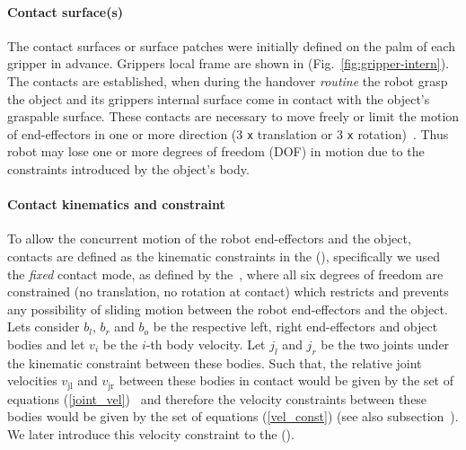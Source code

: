 \paragraph*{Contact surface(s)} 

The contact surfaces or surface patches were initially defined on the palm of each gripper in advance. Grippers local frame are shown in (Fig.~\ref{fig:gripper-intern}). The contacts are established, when during the handover \textit{routine} the robot grasp the object and its grippers internal surface come in contact with the object's graspable surface. These contacts are necessary to move freely or limit the motion of end-effectors in one or more direction (3 \texttt{x} translation or 3 \texttt{x} rotation)~\cite{bouyarmane2018multi}. Thus robot may lose one or more degrees of freedom (DOF) in motion due to the constraints introduced by the object's body.


\paragraph*{Contact kinematics and constraint}

To allow the concurrent motion of the robot end-effectors and the object, contacts are defined as the kinematic constraints in the (), specifically we used the \textit{fixed} contact mode, as defined by the~\cite{balkcom2002computing}, where all six degrees of freedom are constrained (no translation, no rotation at contact) which restricts and prevents any possibility of sliding motion between the robot end-effectors and the object. Lets consider $b_{l}$, $b_{r}$ and $b_o$ be the respective left, right end-effectors and object bodies and let $v_i$ be the $i$-th body velocity. Let $j_l$ and $j_r$ be the two joints under the kinematic constraint between these bodies. Such that, the relative joint velocities $v_\text{jl}$ and $v_\text{jr}$ between these bodies in contact would be given by the set of equations (\ref{joint_vel})~\cite{Featherstone:1987} and therefore the velocity constraints between these bodies would be given by the set of equations (\ref{vel_const}) \cite{ohwovoriole1980externsion} (see also subsection~). We later introduce this velocity constraint to the ().

